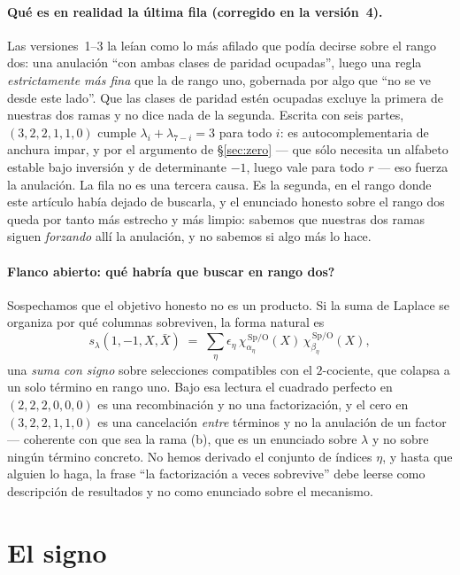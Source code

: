\documentclass[11pt,a4paper]{article}
\begin{document}
\paragraph{Qu\'e es en realidad la \'ultima fila (corregido en la versi\'on~4).} Las
versiones~1--3 la le\'ian como lo m\'as afilado que pod\'ia decirse sobre el rango dos: una
anulaci\'on ``con ambas clases de paridad ocupadas'', luego una regla \emph{estrictamente m\'as
fina} que la de rango uno, gobernada por algo que ``no se ve desde este lado''. Que las clases de
paridad est\'en ocupadas excluye la primera de nuestras dos ramas y no dice nada de la segunda.
Escrita con seis partes, $(3,2,2,1,1,0)$ cumple $\lambda_i+\lambda_{7-i}=3$ para todo $i$: es
autocomplementaria de anchura impar, y por el argumento de \S\ref{sec:zero} --- que s\'olo
necesita un alfabeto estable bajo inversi\'on y de determinante $-1$, luego vale para todo $r$ ---
eso fuerza la anulaci\'on. La fila no es una tercera causa. Es la segunda, en el rango donde este
art\'iculo hab\'ia dejado de buscarla, y el enunciado honesto sobre el rango dos queda por tanto
m\'as estrecho y m\'as limpio: sabemos que nuestras dos ramas siguen \emph{forzando} all\'i la
anulaci\'on, y no sabemos si algo m\'as lo hace.

\paragraph{Flanco abierto: \textquestiondown qu\'e habr\'ia que buscar en rango dos?}
Sospechamos que el objetivo honesto no es un producto. Si la suma de Laplace se organiza por
qu\'e columnas sobreviven, la forma natural es
\[
s_\lambda(1,-1,X,\bar X)\;=\;\sum_\eta \epsilon_\eta\,
\chi^{\,\mathrm{Sp/O}}_{\alpha_\eta}(X)\,\chi^{\,\mathrm{Sp/O}}_{\beta_\eta}(X),
\]
una \emph{suma con signo} sobre selecciones compatibles con el $2$-cociente, que colapsa a un
solo t\'ermino en rango uno. Bajo esa lectura el cuadrado perfecto en $(2,2,2,0,0,0)$ es una
recombinaci\'on y no una factorizaci\'on, y el cero en $(3,2,2,1,1,0)$ es una cancelaci\'on
\emph{entre} t\'erminos y no la anulaci\'on de un factor --- coherente con que sea la rama (b),
que es un enunciado sobre $\lambda$ y no sobre ning\'un t\'ermino concreto. No hemos derivado el conjunto de \'indices $\eta$, y
hasta que alguien lo haga, la frase ``la factorizaci\'on a veces sobrevive'' debe leerse como
descripci\'on de resultados y no como enunciado sobre el mecanismo.

\section{El signo}\label{sec:sign}
\end{document}
